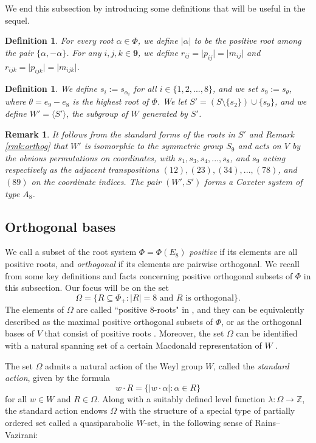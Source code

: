 \documentclass[10pt,a4paper]{amsart}
\newtheorem{defn}[theorem]{Definition}
\newtheorem{rmk}[theorem]{Remark}
\numberwithin{equation}{section}
\newcommand{\al}{\alpha}
\newcommand{\Z}{{\mathbb Z}}
\newcommand{\ra}{\rightarrow}
\newcommand{\nine}{\mathbf{9}}
\newcommand{\ob}{\Omega}
\newcommand{\se}{\subseteq}
\newcommand{\ip}[1]{\langle#1\rangle}
\newcommand{\abs}[1]{\lvert #1 \rvert}
\begin{document}
We end this subsection by introducing some definitions that will be useful in
the sequel. 

\begin{defn}
\label{defn:abs}
For every root $\al\in \Phi$, we define $\abs{\al}$ to be the positive root
among the pair $\{\al,-\al\}$. For any $i,j,k\in \nine$, we define 
$r_{ij}=\abs{p_{ij}}=\abs{m_{ij}}$ and $r_{ijk}=\abs{p_{ijk}}=\abs{m_{ijk}}$.
\end{defn}
 

\begin{defn}
\label{defn:S9}
We define $s_{i}:=s_{\al_i}$ for all $i\in \{1,2,...,8\}$, and we set
$s_9:=s_\theta$, where $\theta=e_9-e_8$ is the highest root of $\Phi$. We let
$S'=(S\setminus\{s_2\})\cup\{s_9\}$, and we define $W'=\ip{S'}$, the subgroup of
$W$ generated by $S'$.
\end{defn}

\begin{rmk}
\label{rmk:S9}
It follows from the standard forms of the roots in $S'$ and Remark
\ref{rmk:orthog} that $W'$ is isomorphic to the symmetric group $S_9$ and acts
on $V$ by the obvious permutations on coordinates, with $s_1,s_3,s_4,...,s_8$,
and $s_9$ acting respectively as the adjacent transpositions
$(12),(23),(34),..., (78)$, and $(89)$ on the coordinate indices. The pair
$(W',S')$ forms a Coxeter system of type $A_8$. \end{rmk}


\subsection{Orthogonal bases}
\label{sec:2025}

We call a subset of the root system $\Phi=\Phi(E_8)$ \emph{positive} if its
elements are all positive roots, and \emph{orthogonal} if its elements are
pairwise orthogonal. We recall from \cite{gx5,gx6} some key definitions and
facts concerning positive orthogonal subsets of $\Phi$ in this subsection. Our
focus will be on the set 
\[
  \ob=\{R\se \Phi_+: \abs{R}=8 \text{ and $R$ is orthogonal}\}.
\] 
The elements of $\ob$ are called ``positive $8$-roots" in \cite{gx5,gx6}, and
they can be equivalently described as the maximal positive orthogonal subsets of
$\Phi$, or as the orthogonal bases of $V$ that consist of positive roots
\cite[Remark 2.4 (ii)]{gx6}. Moreover, the set $\ob$ can be identified with a
natural spanning set of a certain Macdonald representation of $W$ \cite[Section
3]{gx5}. 

The set $\ob$ admits a natural action of the Weyl group $W$, called the
\emph{standard action}, given by the formula 
\[ 
  w\cdot R=\{\abs{w\cdot \al}:\al\in R\} 
\] 
for all $w\in W$ and $R\in \ob$. Along with a suitably defined level function
$\lambda:\ob\ra \Z$, the standard action endows $\ob$ with the structure of a
special type of partially ordered set called a quasiparabolic $W$-set, in the
following sense of Rains--Vazirani: 
\end{document}
